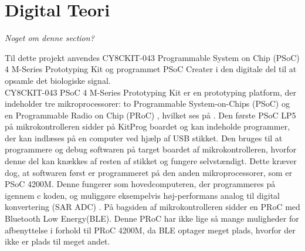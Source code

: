 \section{Digital Teori}
\textit{Noget om denne section?}

Til dette projekt anvendes CY8CKIT-043 Programmable System on Chip (PSoC) 4 M-Series Prototyping Kit og programmet PSoC Creater i den digitale del til at opsamle det biologiske signal.\\
CY8CKIT-043 PSoC 4 M-Series Prototyping Kit er en prototyping platform, der indeholder tre mikroprocessorer: to Programmable System-on-Chips (PSoC) og en Programmable Radio on Chip (PRoC)%
, hvilket ses på . Den første PSoC LP5 på mikrokontrolleren sidder på KitProg boardet og kan indeholde programmer, der kan indlæses på en computer ved hjælp af USB stikket. Den bruges til at programmere og debug softwaren på target boardet af mikrokontrolleren, hvorfor denne del kan knækkes af resten af stikket og fungere selvstændigt. Dette kræver dog, at softwaren først er programmeret på den anden mikroprocessorer, som er PSoC 4200M. Denne fungerer som hovedcomputeren, der programmeres på igennem c koden, og muliggøre eksempelvis høj-performans analog til digital konvertering (SAR ADC) . På bagsiden af mikrokontrolleren sidder en PRoC med Bluetooth Low Energy(BLE). Denne PRoC har ikke lige så mange muligheder for afbenyttelse i forhold til PRoC 4200M, da BLE optager meget plads, hvorfor der ikke er plads til meget andet. \citep{CYPRESS2016PSoC,Semiconductor2016}
